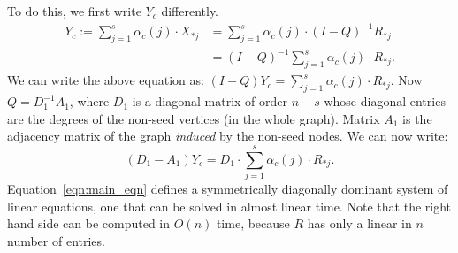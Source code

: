 \documentclass[12pt]{article}
\begin{document}
To do this, we first write $Y_c$ differently.
\begin{align*}
	Y_c := \sum_{j = 1}^{s} \alpha_c(j) \cdot X_{*j} 
		& = \sum_{j = 1}^{s}\alpha_c(j) \cdot (I - Q)^{-1} R_{*j} \\	
		& = (I - Q)^{-1} \sum_{j = 1}^{s} \alpha_c(j) \cdot R_{*j}.
\end{align*}
We can write the above equation as: $(I - Q)Y_c = \sum_{j = 1}^{s} \alpha_c(j) \cdot R_{*j}$.
Now $Q = D_1^{-1}A_1$, where $D_1$ is a diagonal matrix of order $n - s$ whose diagonal entries 
are the degrees of the non-seed vertices (in the whole graph). Matrix $A_1$ is the adjacency
matrix of the graph \emph{induced} by the non-seed nodes. We can now write:
\begin{equation}\label{eqn:main_eqn}
	(D_1 - A_1) Y_c = D_1 \cdot \sum_{j = 1}^{s} \alpha_c(j) \cdot R_{*j}.
\end{equation}
Equation~\ref{eqn:main_eqn} defines a symmetrically diagonally dominant system 
of linear equations, one that can be solved in almost linear time. Note that 
the right hand side can be computed in $O(n)$ time, because $R$ has only a linear 
in $n$ number of entries. 
\end{document}
